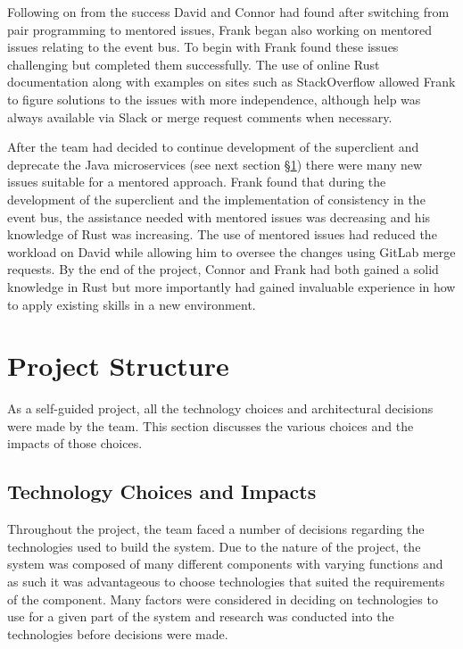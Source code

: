 \documentclass{l3proj}
\begin{document}
Following on from the success David and Connor had found after switching from pair programming to mentored issues, Frank began also working on mentored issues relating to the event bus. To begin with Frank found these issues challenging but completed them successfully. The use of online Rust documentation \cite{rustlangdocs} along with examples on sites such as StackOverflow \cite{stackoverflow} allowed Frank to figure solutions to the issues with more independence, although help was always available via Slack or merge request comments when necessary.

After the team had decided to continue development of the superclient and deprecate the Java microservices (see next section \S\ref{sec:project-structure}) there were many new issues suitable for a mentored approach. Frank found that during the development of the superclient and the implementation of consistency in the event bus, the assistance needed with mentored issues was decreasing and his knowledge of Rust was increasing. The use of mentored issues had reduced the workload on David while allowing him to oversee the changes using GitLab merge requests. By the end of the project, Connor and Frank had both gained a solid knowledge in Rust but more importantly had gained invaluable experience in how to apply existing skills in a new environment.

\section{Project Structure}
\label{sec:project-structure}
As a self-guided project, all the technology choices and architectural decisions were made by the team. This section discusses the various choices and the impacts of those choices.



\subsection{Technology Choices and Impacts}
Throughout the project, the team faced a number of decisions regarding the technologies used to build the system. Due to the nature of the project, the system was composed of many different components with varying functions and as such it was advantageous to choose technologies that suited the requirements of the component. Many factors were considered in deciding on technologies to use for a given part of the system and research was conducted into the technologies before decisions were made.
\end{document}

